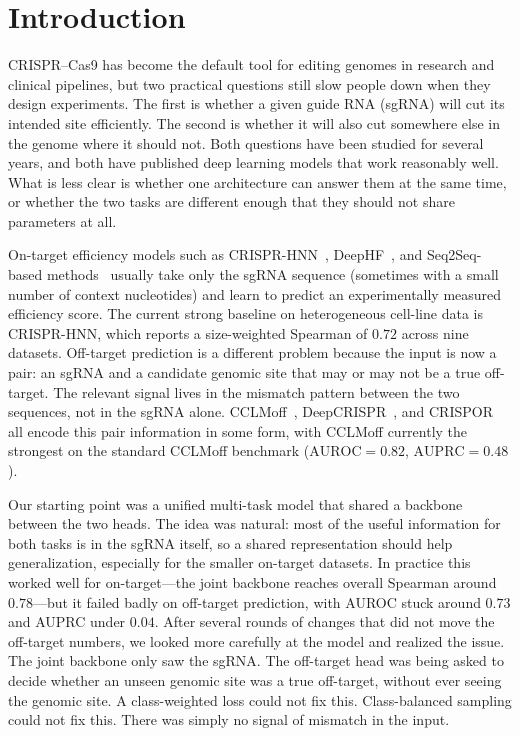 \documentclass[11pt,a4paper]{article}
\begin{document}
\section{Introduction}

CRISPR--Cas9 has become the default tool for editing genomes in research and clinical pipelines, but two practical questions still slow people down when they design experiments. The first is whether a given guide RNA (sgRNA) will cut its intended site efficiently. The second is whether it will also cut somewhere else in the genome where it should not. Both questions have been studied for several years, and both have published deep learning models that work reasonably well. What is less clear is whether one architecture can answer them at the same time, or whether the two tasks are different enough that they should not share parameters at all.

On-target efficiency models such as CRISPR-HNN~\citep{crispr_hnn}, DeepHF~\citep{deephf}, and Seq2Seq-based methods~\citep{seq2seq_sgrna} usually take only the sgRNA sequence (sometimes with a small number of context nucleotides) and learn to predict an experimentally measured efficiency score. The current strong baseline on heterogeneous cell-line data is CRISPR-HNN, which reports a size-weighted Spearman of $0.72$ across nine datasets. Off-target prediction is a different problem because the input is now a pair: an sgRNA and a candidate genomic site that may or may not be a true off-target. The relevant signal lives in the mismatch pattern between the two sequences, not in the sgRNA alone. CCLMoff~\citep{cclmoff}, DeepCRISPR~\citep{deepcrispr}, and CRISPOR~\citep{crispor} all encode this pair information in some form, with CCLMoff currently the strongest on the standard CCLMoff benchmark ($\mathrm{AUROC}=0.82$, $\mathrm{AUPRC}=0.48$).

Our starting point was a unified multi-task model that shared a backbone between the two heads. The idea was natural: most of the useful information for both tasks is in the sgRNA itself, so a shared representation should help generalization, especially for the smaller on-target datasets. In practice this worked well for on-target---the joint backbone reaches overall Spearman around $0.78$---but it failed badly on off-target prediction, with AUROC stuck around $0.73$ and AUPRC under $0.04$. After several rounds of changes that did not move the off-target numbers, we looked more carefully at the model and realized the issue. The joint backbone only saw the sgRNA. The off-target head was being asked to decide whether an unseen genomic site was a true off-target, without ever seeing the genomic site. A class-weighted loss could not fix this. Class-balanced sampling could not fix this. There was simply no signal of mismatch in the input.
\end{document}
